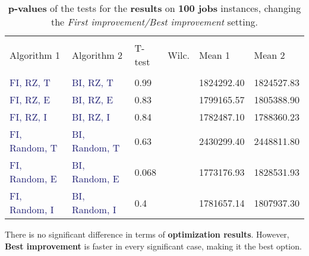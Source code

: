 \documentclass[
12pt,
a4paper,
oneside,
headinclude,
footinclude]{article}
\theoremstyle{definition} %
\begin{document}
\begin{table}[H]
    \begin{tabular}{l l l l l l} %
        \hline
        \hline 
        \\[-1.5ex]
        \textcolor{BrickRed}{Algorithm 1} & \textcolor{BrickRed}{Algorithm 2} & \textcolor{BrickRed}{T-test} & \textcolor{BrickRed}{Wilc.} & \textcolor{BrickRed}{Mean 1} & \textcolor{BrickRed}{Mean 2}\\ [0.5ex]
        \hline %
        \\[-1.5ex]
        \textcolor{MidnightBlue}{FI, RZ, T}     & \textcolor{MidnightBlue}{BI, RZ, T}     & 0.99 &  & 1824292.40 & 1824527.83 \\ 
        \textcolor{MidnightBlue}{FI, RZ, E}     & \textcolor{MidnightBlue}{BI, RZ, E}     & 0.83 &  & 1799165.57 & 1805388.90 \\ 
        \textcolor{MidnightBlue}{FI, RZ, I}     & \textcolor{MidnightBlue}{BI, RZ, I}     & 0.84 &  & 1782487.10 & 1788360.23 \\ 
        \textcolor{MidnightBlue}{FI, Random, T} & \textcolor{MidnightBlue}{BI, Random, T} & 0.63 &  &2430299.40 & 2448811.80 \\ 
        \textcolor{MidnightBlue}{FI, Random, E} & \textcolor{MidnightBlue}{BI, Random, E} & 0.068 &  & 1773176.93 & 1828531.93 \\ 
        \textcolor{MidnightBlue}{FI, Random, I} & \textcolor{MidnightBlue}{BI, Random, I} & 0.4 &  & 1781657.14 & 1807937.30 \\ 
        [1ex] %
        \hline %
    \end{tabular}
    \caption{\label{tab:ii-ty100res}\textbf{p-values} of the tests for the \textbf{results} on \textbf{100 jobs} instances, changing the \textit{First improvement/Best improvement} setting.}
\end{table} 

There is no significant difference in terms of \textbf{optimization results}. However, \textbf{Best improvement} is faster in every significant case, making it the best option.
\end{document}
